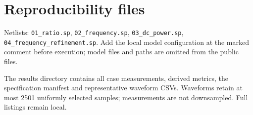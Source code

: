 \section{Reproducibility files}
Netlists: \texttt{01\_ratio.sp}, \texttt{02\_frequency.sp}, \texttt{03\_dc\_power.sp}, \texttt{04\_frequency\_refinement.sp}. Add the local model configuration at the marked comment before execution; model files and paths are omitted from the public files.

The results directory contains all case measurements, derived metrics, the specification manifest and representative waveform CSVs. Waveforms retain at most 2501 uniformly selected samples; measurements are not downsampled. Full listings remain local.

